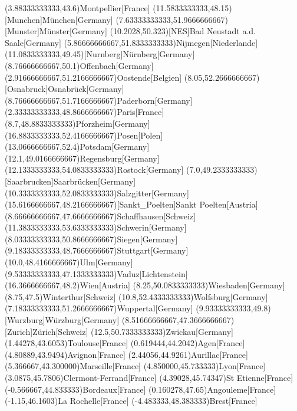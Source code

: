 \mapputIIID(3.88333333333,43.6){Montpellier}[France]
\mapputIIID[-90](11.5833333333,48.15)[Munchen]{M\"{u}nchen}[Germany]
\mapputIIID(7.63333333333,51.9666666667)[Munster]{M\"{u}nster}[Germany]
\mapputIIID[0](10.2028,50.323)[NES]{Bad Neustadt a.d. Saale}[Germany]
\mapputIIID(5.86666666667,51.8333333333){Nijmegen}[Niederlande]
\mapputIIID[-10](11.0833333333,49.45)[Nurnberg]{N\"{u}rnberg}[Germany]
\mapputIIID[-30](8.76666666667,50.1){Offenbach}[Germany]
\mapputIIID(2.91666666667,51.2166666667){Oostende}[Belgien]
\mapputIIID(8.05,52.2666666667)[Osnabruck]{Osnabr\"{u}ck}[Germany]
\mapputIIID(8.76666666667,51.7166666667){Paderborn}[Germany]
\mapputIIID(2.33333333333,48.8666666667){Paris}[France]
\mapputIIID[20](8.7,48.8833333333){Pforzheim}[Germany]
\mapputIIID(16.8833333333,52.4166666667){Posen}[Polen]
\mapputIIID[-90](13.0666666667,52.4){Potsdam}[Germany]
\mapputIIID(12.1,49.0166666667){Regensburg}[Germany]
\mapputIIID[0](12.1333333333,54.0833333333){Rostock}[Germany]
\mapputIIID(7.0,49.2333333333)[Saarbrucken]{Saarbr\"{u}cken}[Germany]
\mapputIIID[-30](10.3333333333,52.0833333333){Salzgitter}[Germany]
\mapputIIID(15.6166666667,48.2166666667)[Sankt_Poelten]{Sankt Poelten}[Austria]
\mapputIIID(8.66666666667,47.6666666667){Schaffhausen}[Schweiz]
\mapputIIID(11.3833333333,53.6333333333){Schwerin}[Germany]
\mapputIIID(8.03333333333,50.8666666667){Siegen}[Germany]
\mapputIIID[0](9.18333333333,48.7666666667){Stuttgart}[Germany]
\mapputIIID(10.0,48.4166666667){Ulm}[Germany]
\mapputIIID[200](9.53333333333,47.1333333333){Vaduz}[Lichtenstein]
\mapputIIID(16.3666666667,48.2){Wien}[Austria]
\mapputIIID[160](8.25,50.0833333333){Wiesbaden}[Germany]
\mapputIIID(8.75,47.5){Winterthur}[Schweiz]
\mapputIIID(10.8,52.4333333333){Wolfsburg}[Germany]
\mapputIIID[0](7.18333333333,51.2666666667){Wuppertal}[Germany]
\mapputIIID(9.93333333333,49.8)[Wurzburg]{W\"{u}rzburg}[Germany]
\mapputIIID(8.51666666667,47.3666666667)[Zurich]{Z\"{u}rich}[Schweiz]
\mapputIIID[-80](12.5,50.7333333333){Zwickau}[Germany]
\mapputIIID[90](1.44278,43.6053){Toulouse}[France]
\mapputIIID[90](0.619444,44.2042){Agen}[France]
\mapputIIID[90](4.80889,43.9494){Avignon}[France]
\mapputIIID[90](2.44056,44.9261){Aurillac}[France]
\mapputIIID[90](5.366667,43.300000){Marseille}[France]
\mapputIIID[0](4.850000,45.733333){Lyon}[France]
\mapputIIID[-90](3.0875,45.7806){Clermont-Ferrand}[France]
\mapputIIID[90](4.39028,45.74347){St Etienne}[France]
\mapputIIID[90](-0.566667,44.833333){Bordeaux}[France]
\mapputIIID[90](0.160278,47.65){Angouleme}[France]
\mapputIIID[90](-1.15,46.1603){La Rochelle}[France]
\mapputIIID[90](-4.483333,48.383333){Brest}[France]
